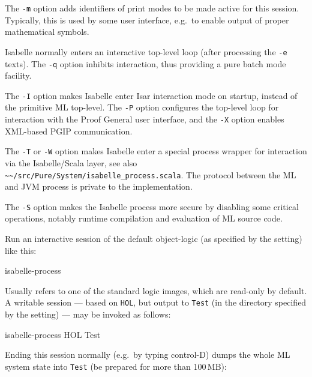 \begin{isabellebody}
\begin{isamarkuptext}
  \medskip The \verb|-m| option adds identifiers of print modes
  to be made active for this session. Typically, this is used by some
  user interface, e.g.\ to enable output of proper mathematical
  symbols.

  \medskip Isabelle normally enters an interactive top-level loop
  (after processing the \verb|-e| texts). The \verb|-q|
  option inhibits interaction, thus providing a pure batch mode
  facility.

  \medskip The \verb|-I| option makes Isabelle enter Isar
  interaction mode on startup, instead of the primitive ML top-level.
  The \verb|-P| option configures the top-level loop for
  interaction with the Proof General user interface, and the
  \verb|-X| option enables XML-based PGIP communication.

  \medskip The \verb|-T| or \verb|-W| option makes
  Isabelle enter a special process wrapper for interaction via the
  Isabelle/Scala layer, see also \verb|~~/src/Pure/System/isabelle_process.scala|.  The protocol between
  the ML and JVM process is private to the implementation.

  \medskip The \verb|-S| option makes the Isabelle process more
  secure by disabling some critical operations, notably runtime
  compilation and evaluation of ML source code.%
\end{isamarkuptext}%
\isamarkuptrue%
%
\isamarkuptrue%
%
\begin{isamarkuptext}%
Run an interactive session of the default object-logic (as specified
  by the \hyperlink{setting.ISABELLE-LOGIC}{\mbox{}} setting) like this:
\begin{ttbox}
isabelle-process
\end{ttbox}

  Usually \hyperlink{setting.ISABELLE-LOGIC}{\mbox{}} refers to one of the standard
  logic images, which are read-only by default.  A writable session
  --- based on \verb|HOL|, but output to \verb|Test| (in the
  directory specified by the \hyperlink{setting.ISABELLE-OUTPUT}{\mbox{}} setting) ---
  may be invoked as follows:
\begin{ttbox}
isabelle-process HOL Test
\end{ttbox}
  Ending this session normally (e.g.\ by typing control-D) dumps the
  whole ML system state into \verb|Test| (be prepared for more
  than 100\,MB):


\end{isamarkuptext}
\end{isabellebody}
